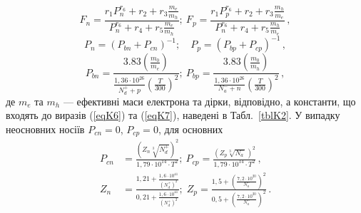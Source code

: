 \documentclass[fleqn,twoside,twocolumn,nofootinbib,showkeys]{revtex4} %
\begin{document}
\begin{equation}\label{eqK7}
 F_n\! =\! \frac{r_1\!  P_n^{r_6}\! +\! r_2\! +\! r_3\!  \frac{m_e}{m_h}}{P_n^{r_6}\! +\! r_4 \!+\! r_5\! \frac{m_e}{m_h}};\:
 F_p\! =\! \frac{r_1\!  P_p^{r_6}\! +\! r_2\! +\! r_3\!  \frac{m_h}{m_e}}{P_n^{r_6}\! +\! r_4\! +\! r_5\! \frac{m_h}{m_e}}\,,
\end{equation}
\begin{equation}\label{eqK8}
  P_n = \left(P_{bn}+P_{cn}\right)^{-1}; \quad
  P_p = \left(P_{bp}+P_{cp}\right)^{-1}\,,
\end{equation}
\begin{equation}\label{eq9c}
  P_{bn} =\frac{3.83\left(\frac{m_0}{m_e}\right)}{\frac{1,36 \cdot 10^{26}}{N_d^+ + p} \left( \frac{T}{300} \right)^2}  ;\:
  P_{bp} =\frac{3.83\left(\frac{m_0}{m_h}\right)}{\frac{1,36 \cdot 10^{26}}{N_a^- + n} \left( \frac{T}{300} \right)^2 }\,,
\end{equation}
де
$m_e$ та $m_h$ --- ефективні маси електрона та дірки, відповідно, а константи, що входять до виразів (\ref{eqK6}) та (\ref{eqK7}),
наведені в Табл.~\ref{tblK2}.
У випадку неосновних носіїв $P_{cn}=0$, $P_{cp}=0$,
для основних
\begin{subequations} \label{eqK9}
    \begin{align}     \label{eqK9a}
      P_{cn}&\! =\! \frac{\left(Z_n\sqrt[3]{N_d^+} \right)^2  }{1,79 \cdot 10^{14}\cdot T^2};\:
 P_{cp}\! =\! \frac{\left(Z_p\sqrt[3]{N_a^-} \right)^2  }{1,79 \cdot 10^{14}\cdot T^2}\,,
 \\
      Z_n &\!=\! \frac{1,21\! +\!  \frac{1,6 \cdot 10^{41}}{\left(N_d^+ \right)^2}}{0,21\! +\! \frac{1,6 \cdot 10^{41}}{\left(N_d^+ \right)^2}};\;
 Z_p\! =\! \frac{1,5\! +\! \left( \frac{7,2 \cdot 10^{20}}{N_a^-} \right)^2}{0,5\! +\! \left( \frac{7,2 \cdot 10^{20}}{N_a^-} \right)^2}\,.
  \label{eqK9b}
    \end{align}
\end{subequations}

\begin{table}
\setlength{\tabcolsep}{2pt}
\caption{Коефіцієнти для розрахунку рухливості відповідно до моделі Klaassen, формули (\ref{eqK6}) та (\ref{eqK7})}
\vskip3mm
\label{tblK2}
\centering
{}
\end{table}
\end{document}
